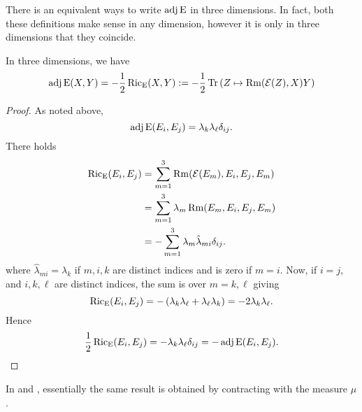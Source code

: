 \documentclass[a4paper,12pt]{amsart}
\begin{document}
There is an equivalent ways to write \(\operatorname{adj}\operatorname{E}\) in three dimensions. In fact, both these definitions make sense in any dimension, however it is only in three dimensions that they coincide.
\begin{lemma}
\label{eq:xcf_equiv}
In three dimensions, we have
\[
\operatorname{adj}\operatorname{E}(X, Y) = -\frac{1}{2} \operatorname{Ric}_{\operatorname{E}} (X, Y) :=- \frac{1}{2} \operatorname{Tr} \left(Z \mapsto \operatorname{Rm}(\operatorname{\mathcal{E}}(Z), X) Y\right)
\]
\end{lemma}
\begin{proof}
As noted above,
\[
\operatorname{adj}\operatorname{E}(E_i, E_j) = \lambda_k \lambda_{\ell} \delta_{ij}.
\]
There holds
\[
\begin{split}
\operatorname{Ric}_{\operatorname{E}}(E_i, E_j) &= \sum_{m=1}^3 \operatorname{Rm}(\operatorname{\mathcal{E}}(E_m), E_i, E_j, E_m) \\
&= \sum_{m=1}^3 \lambda_m \operatorname{Rm}(E_m, E_i, E_j, E_m) \\
&= -\sum_{m=1}^3 \lambda_m \hat{\lambda}_{mi}\delta_{ij}.
\end{split}
\]
where \(\hat{\lambda}_{mi} = \lambda_k\) if \(m,i,k\) are distinct indices and is zero if \(m=i\). Now, if \(i = j\), and \(i, k, \ell\) are distinct indices, the sum is over \(m=k, \ell\) giving
\[
\operatorname{Ric}_{\operatorname{E}}(E_i, E_j) = -\left(\lambda_k \lambda_{\ell} + \lambda_{\ell} \lambda_k\right) = -2\lambda_k \lambda_{\ell}.
\]
Hence
\[
\frac{1}{2} \operatorname{Ric}_{\operatorname{E}}(E_i, E_j) =  -\lambda_k \lambda_{\ell} \delta_{ij} = -\operatorname{adj}\operatorname{E}(E_i, E_j).
\]
\end{proof}
\begin{rem}
In \cite[Lemma 3]{MR2055396} and \cite[Equation (3)]{MR2207496}, essentially the same result is obtained by contracting with the measure \(\mu\).
\end{rem}
\end{document}
